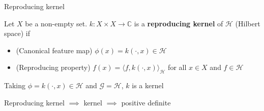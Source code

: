 \documentclass[10pt]{beamer}
\theoremstyle{definition} %
\begin{document}
\begin{frame}{Reproducing kernel}
\begin{definition}
Let $X$ be a non-empty set. $k: X \times X \to \mathbb{C}$ is  a \textbf{reproducing kernel} of $\mathcal{H}$ (Hilbert space) if
\begin{itemize}
    \item (Canonical feature map) $\phi(x) = k(\cdot,x) \in \mathcal{H}$
    \item (Reproducing property) $f(x) = \langle f, k(\cdot,x) \rangle_{\mathcal{H}}$ for all $x\in X$ and $f \in \mathcal{H}$
\end{itemize}
\end{definition}
\begin{corollary}
Taking $\phi = k(\cdot,x) \in \mathcal{H}$ and $\mathcal{G} = \mathcal{H}$, $k$ is a kernel 
\end{corollary}
\begin{center}
    Reproducing kernel $\implies$ kernel $\implies$ positive definite
\end{center}
\end{frame}
\end{document}
